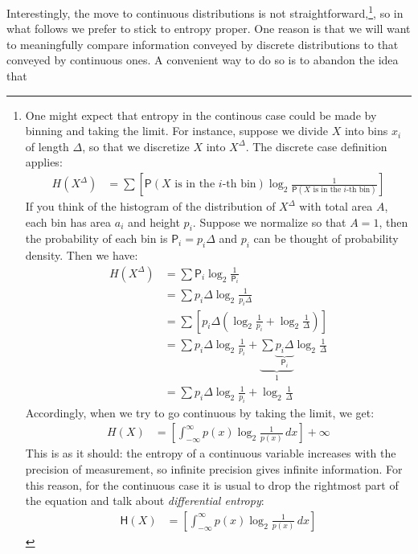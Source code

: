 \documentclass[
  10pt,
  dvipsnames,enabledeprecatedfontcommands]{scrartcl}
\begin{document}
Interestingly, the move to continuous distributions is not
straightforward,\footnote{One might expect that entropy in the continous
  case could be made by binning and taking the limit. For instance,
  suppose we divide \(X\) into bins \(x_i\) of length \(\Delta\), so
  that we discretize \(X\) into \(X^\Delta\). The discrete case
  definition applies: \begin{align*}
  H(X^\Delta) & = \sum \left[\mathsf{P}(X \mbox{ is in the $i$-th bin}) \log_2 \frac{1}{\mathsf{P}(X \mbox{ is in the $i$-th bin})}\right]
  \end{align*} \noindent If you think of the histogram of the
  distribution of \(X^\Delta\) with total area \(A\), each bin has area
  \(a_i\) and height \(p_i\). Suppose we normalize so that \(A =1\),
  then the probability of each bin is \(\mathsf{P}_i = p_i \Delta\) and
  \(p_i\) can be thought of probability density. Then we have:
  \begin{align*}
  H(X^\Delta) & = \sum \mathsf{P}_i \log_2 \frac{1}{\mathsf{P}_i}\\
  & = \sum p_i \Delta \log_2 \frac{1}{p_i \Delta}\\
  & = \sum \left[ p_i \Delta \left(\log_2 \frac{1}{p_i} + \log_2\frac{1}{\Delta}\right)\right]\\
  & = \sum p_i \Delta \log_2 \frac{1}{p_i} +    \underbrace{\sum \underbrace{p_i \Delta}_{\mathsf{P}_i}}_1 \log_2\frac{1}{\Delta} \\
  & = \sum p_i \Delta \log_2 \frac{1}{p_i} +  \log_2\frac{1}{\Delta}
  \end{align*} \noindent Accordingly, when we try to go continuous by
  taking the limit, we get: \begin{align*}
  H(X) & = \left[\int_{-\infty}^\infty p(x) \log_2 \frac{1}{p(x)}\, dx  \right] + \infty
  \end{align*} \noindent This is as it should: the entropy of a
  continuous variable increases with the precision of measurement, so
  infinite precision gives infinite information. For this reason, for
  the continuous case it is usual to drop the rightmost part of the
  equation and talk about \emph{differential entropy}: \begin{align*}
  \mathsf{H}(X) & = \left[\int_{-\infty}^\infty p(x) \log_2 \frac{1}{p(x)}\, dx  \right] 
  \end{align*}}, so in what follows we prefer to stick to entropy
proper. One reason is that we will want to meaningfully compare
information conveyed by discrete distributions to that conveyed by
continuous ones. A convenient way to do so is to abandon the idea that
\end{document}
